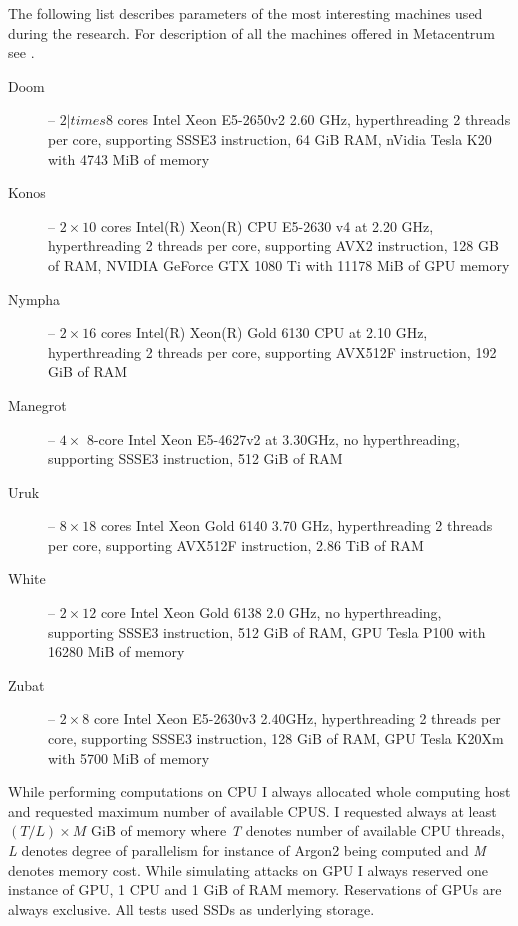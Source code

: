 \documentclass[nolof]{fithesis3}
\begin{document}
The following list describes parameters of the most interesting machines used during the research. For description of all the machines offered in Metacentrum see \parencite{metacentrumhw}.

\begin{description}
\item[Doom] -- $2 |times 8$ cores Intel Xeon E5-2650v2 2.60 GHz, hyperthreading 2 threads per core, supporting SSSE3 instruction, 64 GiB RAM, nVidia Tesla K20 with 4743 MiB of memory

\item[Konos] -- $2\times10$ cores Intel(R) Xeon(R) CPU E5-2630 v4 at 2.20 GHz, hyperthreading 2 threads per core, supporting AVX2 instruction, 128 GB of RAM, NVIDIA GeForce GTX 1080 Ti with 11178 MiB of GPU memory

\item[Nympha] -- $2\times16$ cores Intel(R) Xeon(R) Gold 6130 CPU at 2.10 GHz, hyperthreading 2 threads per core, supporting AVX512F instruction, 192 GiB of RAM

\item[Manegrot] -- $4\times$ 8-core Intel Xeon E5-4627v2 at 3.30GHz, no hyperthreading, supporting SSSE3 instruction, 512 GiB of RAM

\item[Uruk] -- $8\times18$ cores Intel Xeon Gold 6140  3.70 GHz, hyperthreading 2 threads per core, supporting AVX512F instruction, 2.86 TiB of RAM

\item[White] -- $2\times12$ core Intel Xeon Gold 6138 2.0 GHz, no hyperthreading, supporting SSSE3 instruction, 512 GiB of RAM, GPU Tesla P100 with 16280 MiB of memory

\item[Zubat] -- $2\times8$ core Intel Xeon E5-2630v3 2.40GHz, hyperthreading 2 threads per core, supporting SSSE3 instruction, 128 GiB of RAM, GPU Tesla K20Xm with 5700 MiB of memory
\end{description}

While performing computations on CPU I always allocated whole computing host and requested maximum number of available CPUS. I requested always at least $(T/L) \times M$ GiB of memory where \emph{T} denotes number of available CPU threads, \emph{L} denotes degree of parallelism for instance of Argon2 being computed and \emph{M} denotes memory cost. While simulating attacks on GPU I always reserved one instance of GPU, 1 CPU and 1 GiB of RAM memory. Reservations of GPUs are always exclusive. All tests used SSDs as underlying storage.
\end{document}
